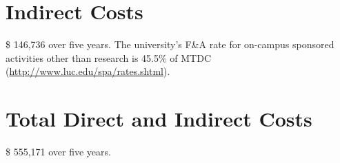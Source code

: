 
\section*{Indirect Costs}

\$  146,736   over five years.  The university's F\&A rate for on-campus sponsored activities other than research is 45.5\% of MTDC  (\url{http://www.luc.edu/spa/rates.shtml}). 

 

\section*{Total Direct and Indirect Costs}

\$  555,171 over five years. 

 




